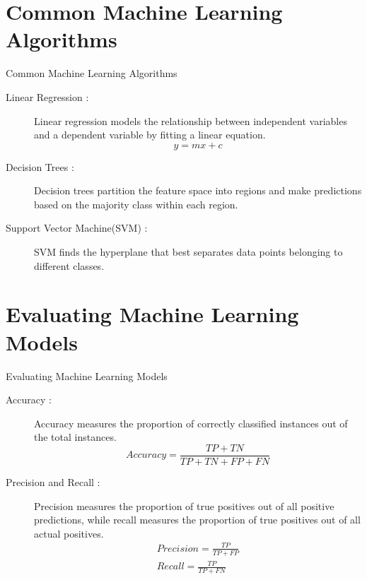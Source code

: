 \documentclass{beamer}
\begin{document}
	\section{Common Machine Learning Algorithms}
	\begin{frame}{Common Machine Learning Algorithms}
		\begin{description}
			\item[Linear Regression :] Linear regression models the relationship between independent variables and a dependent variable by fitting a linear equation.
			\begin{equation} 
				y = mx+c
			\end{equation}
			\item[Decision Trees : ]Decision trees partition the feature space into regions and make predictions based on the majority class within each region.
			\item[Support Vector Machine(SVM) :] SVM finds the hyperplane that best separates data points belonging to different classes.
		\end{description}
	\end{frame}
	
	\section{Evaluating Machine Learning Models}
	\begin{frame}{Evaluating Machine Learning Models}
		\begin{description}
			\item[Accuracy :] Accuracy measures the proportion of correctly classified instances out of the total instances.
			\begin{equation}
				Accuracy = \frac{TP+TN}{TP+TN+FP+FN}
			\end{equation}
			\item[Precision and Recall :] Precision measures the proportion of true positives out of all positive predictions, while recall measures the proportion of true positives out of all actual positives.
			\begin{equation}
				\begin{split}
					Precision = \frac{TP}{TP+FP}\\
					Recall = \frac{TP}{TP+FN}
				\end{split}
			\end{equation}
			
		\end{description}
	\end{frame}
	
\end{document}
